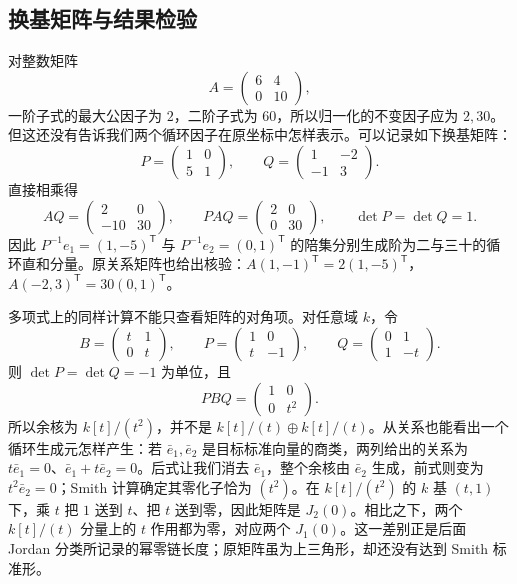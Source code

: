 \subsection{换基矩阵与结果检验}
\label{b2:subsec:0402:03}

对整数矩阵
\[
	A=\begin{pmatrix}6&4\\0&10\end{pmatrix},
\]
一阶子式的最大公因子为 \(2\)，二阶子式为 \(60\)，所以归一化的不变因子应为 \(2,30\)。但这还没有告诉我们两个循环因子在原坐标中怎样表示。可以记录如下换基矩阵：
\[
	P=\begin{pmatrix}1&0\\5&1\end{pmatrix},\qquad
	Q=\begin{pmatrix}1&-2\\-1&3\end{pmatrix}.
\]
直接相乘得
\[
	AQ=\begin{pmatrix}2&0\\-10&30\end{pmatrix},\qquad
	PAQ=\begin{pmatrix}2&0\\0&30\end{pmatrix},
	\qquad\det P=\det Q=1.
\]
因此 \(P^{-1}e_1=(1,-5)^{\mathsf T}\) 与 \(P^{-1}e_2=(0,1)^{\mathsf T}\) 的陪集分别生成阶为二与三十的循环直和分量。原关系矩阵也给出核验：\(A(1,-1)^{\mathsf T}=2(1,-5)^{\mathsf T}\)，\(A(-2,3)^{\mathsf T}=30(0,1)^{\mathsf T}\)。

\ProseParagraphBreak
多项式上的同样计算不能只查看矩阵的对角项。对任意域 \(k\)，令
\[
	B=\begin{pmatrix}t&1\\0&t\end{pmatrix},\qquad
	P=\begin{pmatrix}1&0\\t&-1\end{pmatrix},\qquad
	Q=\begin{pmatrix}0&1\\1&-t\end{pmatrix}.
\]
则 \(\det P=\det Q=-1\) 为单位，且
\[
	PBQ=\begin{pmatrix}1&0\\0&t^2\end{pmatrix}.
\]
所以余核为 \(k[t]/(t^2)\)，并不是 \(k[t]/(t)\oplus k[t]/(t)\)。从关系也能看出一个循环生成元怎样产生：若 \(\bar e_1,\bar e_2\) 是目标标准向量的商类，两列给出的关系为 \(t\bar e_1=0\)、\(\bar e_1+t\bar e_2=0\)。后式让我们消去 \(\bar e_1\)，整个余核由 \(\bar e_2\) 生成，前式则变为 \(t^2\bar e_2=0\)；Smith 计算确定其零化子恰为 \((t^2)\)。在 \(k[t]/(t^2)\) 的 \(k\) 基 \((t,1)\) 下，乘 \(t\) 把 \(1\) 送到 \(t\)、把 \(t\) 送到零，因此矩阵是 \(J_2(0)\)。相比之下，两个 \(k[t]/(t)\) 分量上的 \(t\) 作用都为零，对应两个 \(J_1(0)\)。这一差别正是后面 Jordan 分类所记录的幂零链长度；原矩阵虽为上三角形，却还没有达到 Smith 标准形。

